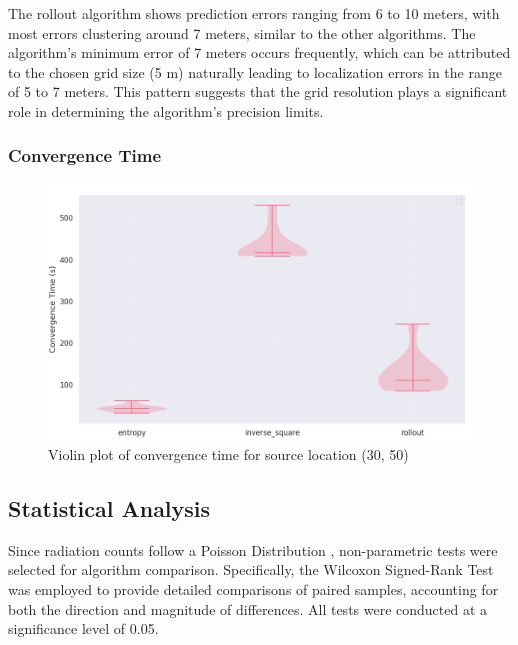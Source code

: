 \documentclass[../report.tex]{subfiles}
\begin{document}
    The rollout algorithm shows prediction errors ranging from 6 to 10 meters, with most errors clustering around 7 meters, similar to the other algorithms. The algorithm's minimum error of 7 
    meters occurs frequently, which can be attributed to the chosen grid size (5 m) naturally leading to localization errors in the range of 5 to 7 meters. This pattern suggests that the grid 
    resolution plays a significant role in determining the algorithm's precision limits.

    \subsubsection{Convergence Time}

    \begin{figure}[ht]
        \centering
        \includegraphics[width=\linewidth]{figures/convergence_violin_plot.png}
        \caption{Violin plot of convergence time for source location (30, 50)}
        \label{fig:convergence_violin_plot}
    \end{figure}

    

    \subsection{Statistical Analysis}

    Since radiation counts follow a Poisson Distribution \cite{ristic2010information}, non-parametric tests were selected for algorithm comparison. Specifically, the Wilcoxon Signed-Rank Test was 
    employed to provide detailed comparisons of paired samples, accounting for both the direction and magnitude of differences. All tests were conducted at a significance level of 0.05.
\end{document}

